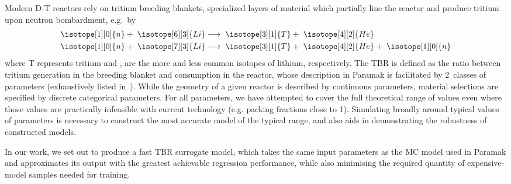 Modern D-T reactors rely on tritium breeding blankets, specialized
layers of material which partially line the reactor and produce tritium upon
neutron bombardment, e.g.~by 
\begin{eqnarray}
	\isotope[1][0]{n} + \hspace{3pt} \isotope[6][3]{Li} 
	&\longrightarrow \hspace{3pt} 
	\isotope[3][1]{T} + \hspace{3pt}\isotope[4][2]{He} \\
	\isotope[1][0]{n} + \hspace{3pt} \isotope[7][3]{Li} 
	&\longrightarrow \hspace{3pt} 
	\isotope[3][1]{T} + \hspace{3pt} \isotope[4][2]{He} + \hspace{3pt} \isotope[1][0]{n}
\end{eqnarray}%
where T represents tritium and ,  are the more and
less common isotopes of lithium, respectively. The TBR is defined as the ratio
between tritium generation in the breeding blanket and consumption in the
reactor, whose description in Paramak is facilitated by 2~classes of parameters
(exhaustively listed in~). While the geometry of a given
reactor is described by continuous parameters, material selections are specified
by discrete categorical parameters. For all parameters, we have attempted to cover the full theoretical range of values even where those values are practically infeasible with current technology (e.g. packing fractions close to 1). Simulating broadly around typical values of parameters is necessary to construct the most accurate model of the typical range, and also aids in demonstrating the robustness of constructed models.

In our work, we set out to produce a fast TBR surrogate model, which takes the same input parameters as the MC model used in Paramak and approximates its output with the greatest achievable regression performance, while also minimising the required quantity of expensive-model samples needed for training.

